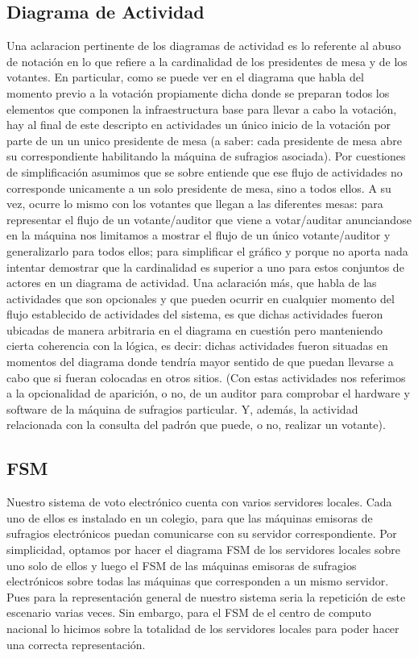 \documentclass[spanish, 10pt,a4paper]{article}
\numberwithin{equation}{section} %
\begin{document}
\subsection{Diagrama de Actividad}
Una aclaracion pertinente de los diagramas de actividad es lo referente al abuso de notación en lo que refiere a la cardinalidad de los presidentes de mesa y de los votantes. En particular, como se puede ver en el diagrama que habla del momento previo a la votaci\'on propiamente dicha donde se preparan todos los elementos que componen la infraestructura base para llevar a cabo la votaci\'on, hay al final de este descripto en actividades un \'unico inicio de la votaci\'on por parte de un un unico presidente de mesa (a saber: cada presidente de mesa abre su correspondiente habilitando la m\'aquina de sufragios asociada). Por cuestiones de simplificaci\'on asumimos que se sobre entiende que ese flujo de actividades no corresponde unicamente a un solo presidente de mesa, sino a todos ellos.
A su vez, ocurre lo mismo con los votantes que llegan a las diferentes mesas: para representar el flujo de un votante/auditor que viene a votar/auditar anunciandose en la m\'aquina nos limitamos a mostrar el flujo de un \'unico votante/auditor y generalizarlo para todos ellos; para simplificar el gr\'afico y porque no aporta nada intentar demostrar que la cardinalidad es superior a uno para estos conjuntos de actores en un diagrama de actividad. 
Una aclaraci\'on m\'as, que habla de las actividades que son opcionales y que pueden ocurrir en cualquier momento del flujo establecido de actividades del sistema, es que dichas actividades fueron ubicadas de manera arbitraria en el diagrama en cuesti\'on pero manteniendo cierta coherencia con la l\'ogica, es decir: dichas actividades fueron situadas en momentos del diagrama donde tendr\'ia mayor sentido de que puedan llevarse a cabo que si fueran colocadas en otros sitios. (Con estas actividades nos referimos a la opcionalidad de aparici\'on, o no, de un auditor para comprobar el hardware y software de la m\'aquina de sufragios particular. Y, adem\'as, la actividad relacionada con la consulta del padr\'on que puede, o no, realizar un votante).
\subsection{FSM}
Nuestro sistema de voto electr\'onico cuenta con varios servidores locales. Cada uno de ellos es instalado en un colegio, para que las m\'aquinas emisoras de sufragios electr\'onicos puedan comunicarse con su servidor correspondiente. Por simplicidad, optamos por hacer el diagrama FSM de los servidores locales sobre uno solo de ellos y luego el FSM de las m\'aquinas emisoras de sufragios electr\'onicos sobre todas las m\'aquinas que corresponden a un mismo servidor. Pues para la representación general de nuestro sistema seria la repetici\'on de este escenario varias veces. Sin embargo, para el FSM de el centro de computo nacional lo hicimos sobre la totalidad de los servidores locales para poder hacer una correcta representaci\'on.
\end{document}
